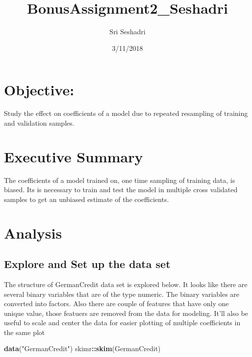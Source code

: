 \documentclass[]{article}
\title{BonusAssignment2\_Seshadri}
\author{Sri Seshadri}
\date{3/11/2018}
\newenvironment{Shaded}{\begin{snugshade}}{\end{snugshade}}
\newcommand{\KeywordTok}[1]{\textcolor[rgb]{0.13,0.29,0.53}{\textbf{#1}}}
\newcommand{\StringTok}[1]{\textcolor[rgb]{0.31,0.60,0.02}{#1}}
\newcommand{\OperatorTok}[1]{\textcolor[rgb]{0.81,0.36,0.00}{\textbf{#1}}}
\newcommand{\NormalTok}[1]{#1}
\begin{document}
\maketitle

\section{Objective:}\label{objective}

Study the effect on coefficients of a model due to repeated resampling
of training and validation samples.

\section{Executive Summary}\label{executive-summary}

The coefficients of a model trained on, one time sampling of training
data, is biased. Its is necessary to train and test the model in
multiple cross validated samples to get an unbiased estimate of the
coefficients.

\section{Analysis}\label{analysis}

\subsection{Explore and Set up the data
set}\label{explore-and-set-up-the-data-set}

The structure of GermanCredit data set is explored below. It looks like
there are several binary variables that are of the type numeric. The
binary variables are converted into factors. Also there are couple of
features that have only one unique value, those featuers are removed
from the data for modeling. It'll also be useful to scale and center the
data for easier plotting of multiple coefficients in the same plot

\begin{Shaded}
\begin{Highlighting}[]
\KeywordTok{data}\NormalTok{(}\StringTok{"GermanCredit"}\NormalTok{)}
\NormalTok{skimr}\OperatorTok{::}\KeywordTok{skim}\NormalTok{(GermanCredit)}
\end{Highlighting}
\end{Shaded}
\end{document}
